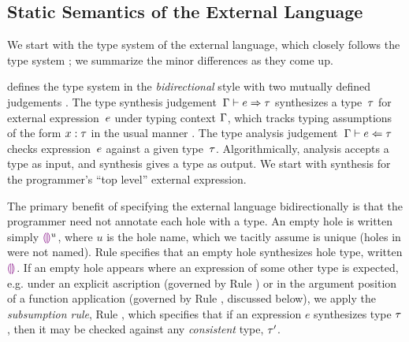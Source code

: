 
\subsection{Static Semantics of the External Language}
\label{sec:external-statics}


We start with the type system of the \HazelnutLive external language,
which closely follows the \Hazelnut type system \cite{popl-paper}; we summarize the minor differences as they come up.


 defines the type system in the \emph{bidirectional} style 
%
with two mutually defined judgements \cite{Pierce:2000ve,bidi-tutorial,DBLP:conf/icfp/DunfieldK13,Chlipala:2005da}. The type synthesis
judgement~$\Gamma \vdash e \Rightarrow \tau$ synthesizes a type~$\tau$
for external expression~$e$ under typing context $\Gamma$, which tracks typing
assumptions of the form $x : \tau$ in the usual
manner \cite{pfpl,tapl}.
%
The type analysis judgement~$\Gamma \vdash e \Leftarrow \tau$ checks
expression~$e$ against a given type~$\tau$.
%
Algorithmically, analysis accepts a type as input, and synthesis gives
a type as output.
%
We start with synthesis for the programmer's ``top level'' external
expression.


The primary benefit of specifying the \HazelnutLive external language 
bidirectionally is that the programmer need not annotate each hole with a type. 
%
An empty hole is
written simply $\textcolor{violet}{\llparenthesis}\textcolor{violet}{\rrparenthesis}^{u}$, where $u$ is the hole name, which we tacitly assume is unique 
(holes in \Hazelnut were not named).
Rule  specifies that an empty hole synthesizes hole type, written $\textcolor{violet}{\llparenthesis}\textcolor{violet}{\rrparenthesis}$.
%
If an empty hole appears where an expression of some other type is
expected, e.g. under an explicit ascription (governed by Rule )
or in the argument position of a function application (governed by
Rule , discussed below), we apply the \emph{subsumption rule},
Rule , which specifies that if an expression $e$ synthesizes
type $\tau$, then it may be checked against any \emph{consistent}
type, $\tau'$.

